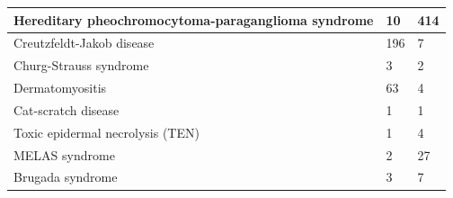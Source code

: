 \documentclass[10pt,letterpaper,final]{article}
\begin{document}
\begin{center}
\begin{small}
\begin{tabular}{|p{6cm}|p{2.5cm}|p{2.5cm}|}
    Hereditary pheochromocytoma-paraganglioma syndrome & 10 & 414\\    \hline
    Creutzfeldt-Jakob disease & 196 & 7\\    \hline
    Churg-Strauss syndrome & 3 & 2\\    \hline
    Dermatomyositis & 63 & 4\\    \hline
    Cat-scratch disease & 1 & 1\\    \hline
    Toxic epidermal necrolysis (TEN) & 1 & 4\\    \hline
    MELAS syndrome & 2 & 27\\    \hline
    Brugada syndrome & 3 & 7\\    \hline
	\end{tabular}
\end{small}
\end{center}
\end{document}

